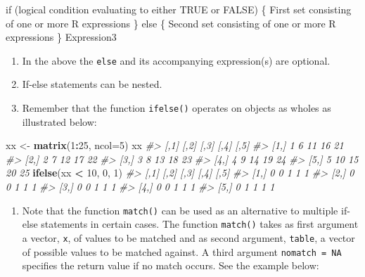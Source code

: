 \documentclass[
]{book}
\newenvironment{Shaded}{\begin{snugshade}}{\end{snugshade}}
\newcommand{\AttributeTok}[1]{\textcolor[rgb]{0.13,0.29,0.53}{#1}}
\newcommand{\CommentTok}[1]{\textcolor[rgb]{0.56,0.35,0.01}{\textit{#1}}}
\newcommand{\DecValTok}[1]{\textcolor[rgb]{0.00,0.00,0.81}{#1}}
\newcommand{\FunctionTok}[1]{\textcolor[rgb]{0.13,0.29,0.53}{\textbf{#1}}}
\newcommand{\NormalTok}[1]{#1}
\newcommand{\OtherTok}[1]{\textcolor[rgb]{0.56,0.35,0.01}{#1}}
\newcommand{\SpecialCharTok}[1]{\textcolor[rgb]{0.81,0.36,0.00}{\textbf{#1}}}
\providecommand{\tightlist}{%
  \setlength{\itemsep}{0pt}\setlength{\parskip}{0pt}}
\begin{document}
\begin{Shaded}
\begin{Highlighting}[]
\NormalTok{if (logical condition evaluating to either TRUE or FALSE)}
\NormalTok{    \{}
\NormalTok{     First set consisting of one or more R expressions}
\NormalTok{    \}}
\NormalTok{else}
\NormalTok{    \{}
\NormalTok{     Second set consisting of one or more R expressions}
\NormalTok{    \} }
\NormalTok{Expression3}
\end{Highlighting}
\end{Shaded}

\begin{enumerate}
\def\labelenumi{(\alph{enumi})}
\setcounter{enumi}{1}
\item
  In the above the \texttt{else} and its accompanying expression(s) are optional.
\item
  If-else statements can be nested.
\item
  Remember that the function \texttt{ifelse()} operates on objects as wholes as illustrated below:
\end{enumerate}

\begin{Shaded}
\begin{Highlighting}[]
\NormalTok{xx }\OtherTok{\textless{}{-}} \FunctionTok{matrix}\NormalTok{(}\DecValTok{1}\SpecialCharTok{:}\DecValTok{25}\NormalTok{, }\AttributeTok{ncol=}\DecValTok{5}\NormalTok{)}
\NormalTok{xx}
\CommentTok{\#\textgreater{}      [,1] [,2] [,3] [,4] [,5]}
\CommentTok{\#\textgreater{} [1,]    1    6   11   16   21}
\CommentTok{\#\textgreater{} [2,]    2    7   12   17   22}
\CommentTok{\#\textgreater{} [3,]    3    8   13   18   23}
\CommentTok{\#\textgreater{} [4,]    4    9   14   19   24}
\CommentTok{\#\textgreater{} [5,]    5   10   15   20   25}
\FunctionTok{ifelse}\NormalTok{(xx }\SpecialCharTok{\textless{}} \DecValTok{10}\NormalTok{, }\DecValTok{0}\NormalTok{, }\DecValTok{1}\NormalTok{)}
\CommentTok{\#\textgreater{}      [,1] [,2] [,3] [,4] [,5]}
\CommentTok{\#\textgreater{} [1,]    0    0    1    1    1}
\CommentTok{\#\textgreater{} [2,]    0    0    1    1    1}
\CommentTok{\#\textgreater{} [3,]    0    0    1    1    1}
\CommentTok{\#\textgreater{} [4,]    0    0    1    1    1}
\CommentTok{\#\textgreater{} [5,]    0    1    1    1    1}
\end{Highlighting}
\end{Shaded}

\begin{enumerate}
\def\labelenumi{(\alph{enumi})}
\setcounter{enumi}{4}
\tightlist
\item
  Note that the function \texttt{match()} can be used as an alternative to multiple if-else statements in certain cases. The function \texttt{match()} takes as first argument a vector, \texttt{x}, of values to be matched and as second argument, \texttt{table}, a vector of possible values to be matched against. A third argument \texttt{nomatch\ =\ NA} specifies the return value if no match occurs. See the example below:
\end{enumerate}
\end{document}
